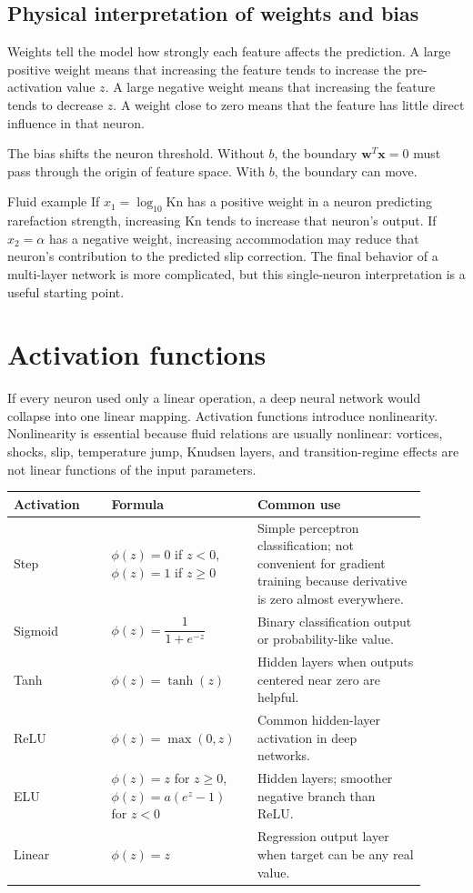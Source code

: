 \documentclass[11pt]{article}
\newcommand{\kn}{\mathrm{Kn}}
\newcommand{\bx}{\bm{x}}
\begin{document}
\subsection{Physical interpretation of weights and bias}

Weights tell the model how strongly each feature affects the prediction.  A large positive weight means that increasing the feature tends to increase the pre-activation value $z$.  A large negative weight means that increasing the feature tends to decrease $z$.  A weight close to zero means that the feature has little direct influence in that neuron.

The bias shifts the neuron threshold.  Without $b$, the boundary $\bm{w}^T\bx=0$ must pass through the origin of feature space.  With $b$, the boundary can move.

\begin{examplebox}{Fluid example}
If $x_1=\log_{10}\kn$ has a positive weight in a neuron predicting rarefaction strength, increasing $\kn$ tends to increase that neuron's output.  If $x_2=\alpha$ has a negative weight, increasing accommodation may reduce that neuron's contribution to the predicted slip correction.  The final behavior of a multi-layer network is more complicated, but this single-neuron interpretation is a useful starting point.
\end{examplebox}

\section{Activation functions}

If every neuron used only a linear operation, a deep neural network would collapse into one linear mapping.  Activation functions introduce nonlinearity.  Nonlinearity is essential because fluid relations are usually nonlinear: vortices, shocks, slip, temperature jump, Knudsen layers, and transition-regime effects are not linear functions of the input parameters.

\begin{longtable}{p{0.22\linewidth}p{0.30\linewidth}p{0.38\linewidth}}
\toprule
Activation & Formula & Common use \\
\midrule
Step & $\phi(z)=0$ if $z<0$, $\phi(z)=1$ if $z\ge0$ & Simple perceptron classification; not convenient for gradient training because derivative is zero almost everywhere. \\
Sigmoid & $\phi(z)=\dfrac{1}{1+e^{-z}}$ & Binary classification output or probability-like value. \\
Tanh & $\phi(z)=\tanh(z)$ & Hidden layers when outputs centered near zero are helpful. \\
ReLU & $\phi(z)=\max(0,z)$ & Common hidden-layer activation in deep networks. \\
ELU & $\phi(z)=z$ for $z\ge0$, $\phi(z)=a(e^z-1)$ for $z<0$ & Hidden layers; smoother negative branch than ReLU. \\
Linear & $\phi(z)=z$ & Regression output layer when target can be any real value. \\
\bottomrule
\end{longtable}
\end{document}
